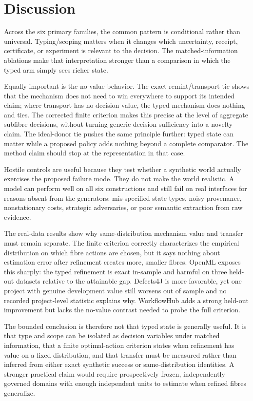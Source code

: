 \section{Discussion}

Across the six primary families, the common pattern is conditional rather than universal. Typing/scoping matters when it changes which uncertainty, receipt, certificate, or experiment is relevant to the decision. The matched-information ablations make that interpretation stronger than a comparison in which the typed arm simply sees richer state.

Equally important is the no-value behavior. The exact remint/transport tie shows that the mechanism does not need to win everywhere to support its intended claim; where transport has no decision value, the typed mechanism does nothing and ties. The corrected finite criterion makes this precise at the level of aggregate subfibre decisions, without turning generic decision sufficiency into a novelty claim. The ideal-donor tie pushes the same principle further: typed state can matter while a proposed policy adds nothing beyond a complete comparator. The method claim should stop at the representation in that case.

Hostile controls are useful because they test whether a synthetic world actually exercises the proposed failure mode. They do not make the world realistic. A model can perform well on all six constructions and still fail on real interfaces for reasons absent from the generators: mis-specified state types, noisy provenance, nonstationary costs, strategic adversaries, or poor semantic extraction from raw evidence.

The real-data results show why same-distribution mechanism value and transfer must remain separate. The finite criterion correctly characterizes the empirical distribution on which fibre actions are chosen, but it says nothing about estimation error after refinement creates more, smaller fibres. OpenML exposes this sharply: the typed refinement is exact in-sample and harmful on three held-out datasets relative to the attainable gap. Defects4J is more favorable, yet one project with genuine development value still worsens out of sample and no recorded project-level statistic explains why. WorkflowHub adds a strong held-out improvement but lacks the no-value contrast needed to probe the full criterion.

The bounded conclusion is therefore not that typed state is generally useful. It is that type and scope can be isolated as decision variables under matched information, that a finite optimal-action criterion states when refinement has value on a fixed distribution, and that transfer must be measured rather than inferred from either exact synthetic success or same-distribution identities. A stronger practical claim would require prospectively frozen, independently governed domains with enough independent units to estimate when refined fibres generalize.
